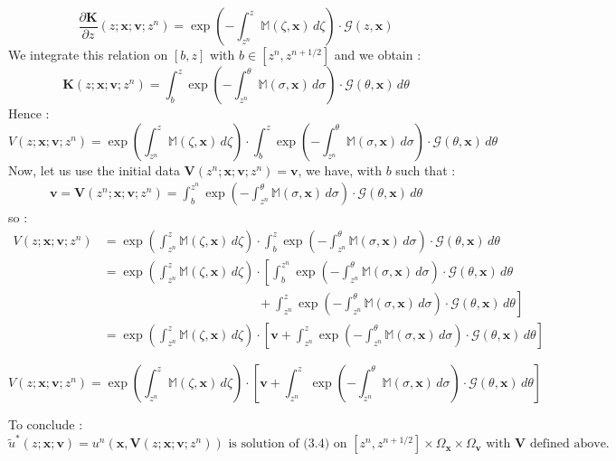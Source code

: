 \documentclass[10pt]{article}
\newcommand{\D}{{\partial}}
\begin{document}
$$\frac{\D \mathbf{K}}{\D z}(z;\mathbf{x;v};z^n) = \exp\left(- \int_{z^n}^z \mathbb{M}(\zeta,\mathbf{x})\,d\zeta\right)\cdot\mathcal{G}(z,\mathbf{x})$$
We integrate this relation on $[b,z]$ with $b\in\left[z^n,z^{n+1/2}\right]$ and we obtain :
$$
\mathbf{K}(z;\mathbf{x;v};z^n) = \int_b^z \exp\left(- \int_{z^n}^{\theta} \mathbb{M}(\sigma,\mathbf{x})\,d\sigma\right)\cdot\mathcal{G}(\theta,\mathbf{x})\,d\theta
$$
Hence :
$$
V(z;\mathbf{x;v};z^n) = \exp\left(\int_{z^n}^z \mathbb{M}(\zeta,\mathbf{x})\,d\zeta\right)\cdot\int_b^z \exp\left(- \int_{z^n}^{\theta} \mathbb{M}(\sigma,\mathbf{x})\,d\sigma\right)\cdot\mathcal{G}(\theta,\mathbf{x})\,d\theta
$$
Now, let us use the initial data $\mathbf{V}(z^n;\mathbf{x;v};z^n) = \mathbf{v}$, we have, with $b$ such that :
\begin{align*}
\mathbf{v} = \mathbf{V}(z^n;\mathbf{x;v};z^n) = \int_{b}^{z^n} \exp\left(- \int_{z^n}^{\theta} \mathbb{M}(\sigma,\mathbf{x})\,d\sigma\right)\cdot\mathcal{G}(\theta,\mathbf{x})\,d\theta
\end{align*}
so :
\begin{align*}
V(z;\mathbf{x;v};z^n) &= \exp\left(\int_{z^n}^z \mathbb{M}(\zeta,\mathbf{x})\,d\zeta\right)\cdot\int_b^z \exp\left(- \int_{z^n}^{\theta} \mathbb{M}(\sigma,\mathbf{x})\,d\sigma\right)\cdot\mathcal{G}(\theta,\mathbf{x})\,d\theta \\
&= \exp\left(\int_{z^n}^z \mathbb{M}(\zeta,\mathbf{x})\,d\zeta\right)\cdot\left[\int_b^{z^n} \exp\left(- \int_{z^n}^{\theta} \mathbb{M}(\sigma,\mathbf{x})\,d\sigma\right)\cdot\mathcal{G}(\theta,\mathbf{x})\,d\theta\right. \\
&\;\;\;\;\;\;\;\;\;\;\;\;\;\;\;\;\;\;\;\;\;\;\;\;\;\;\;\;\;\;\;\;\;\;\;\;\;\;\;\;\;\;\;\;+ \left.\int_{z^n}^z \exp\left(- \int_{z^n}^{\theta} \mathbb{M}(\sigma,\mathbf{x})\,d\sigma\right)\cdot\mathcal{G}(\theta,\mathbf{x})\,d\theta\right] \\
&= \exp\left(\int_{z^n}^z \mathbb{M}(\zeta,\mathbf{x})\,d\zeta\right)\cdot\left[\mathbf{v}+ \int_{z^n}^z \exp\left(- \int_{z^n}^{\theta} \mathbb{M}(\sigma,\mathbf{x})\,d\sigma\right)\cdot\mathcal{G}(\theta,\mathbf{x})\,d\theta\right]
\end{align*}

$$\boxed{V(z;\mathbf{x;v};z^n) = \exp\left(\int_{z^n}^z \mathbb{M}(\zeta,\mathbf{x})\,d\zeta\right)\cdot\left[\mathbf{v} + \int_{z^n}^z \exp\left(- \int_{z^n}^{\theta} \mathbb{M}(\sigma,\mathbf{x})\,d\sigma\right)\cdot\mathcal{G}(\theta,\mathbf{x})\,d\theta\right]}$$

To conclude :
$$\boxed{\tilde{u}^*(z;\mathbf{x;v}) = u^n\left(\mathbf{x},\mathbf{V}(z;\mathbf{x;v};z^n)\right) \mbox{ is solution of (3.4) on } \left[z^n,z^{n+1/2}\right]\times\Omega_{\mathbf{x}}\times\Omega_{\mathbf{v}} \mbox{ with } \mathbf{V} \mbox{ defined above. } }$$
\end{document}
